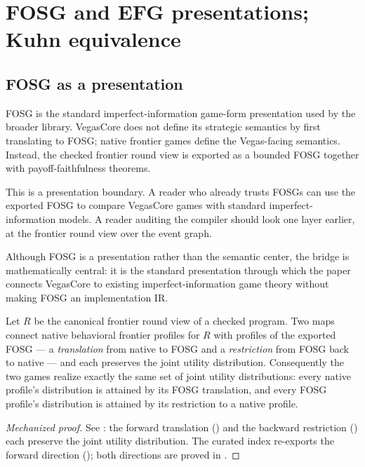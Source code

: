 \section{FOSG and EFG presentations; Kuhn equivalence}
\label{sec:presentations}

\subsection{FOSG as a presentation}

FOSG is the standard imperfect-information game-form presentation used
by the broader library.  VegasCore does not define its strategic
semantics by first translating to FOSG; native frontier games define the
Vegas-facing semantics.  Instead, the checked frontier round view is
exported as a bounded FOSG together with payoff-faithfulness theorems.

This is a presentation boundary.  A reader who already trusts FOSGs can
use the exported FOSG to compare VegasCore games with standard
imperfect-information models.  A reader auditing the compiler should
look one layer earlier, at the frontier round view over the event graph.

Although FOSG is a presentation rather than the semantic center, the
bridge is mathematically central: it is the standard presentation
through which the paper connects VegasCore to existing
imperfect-information game theory without making FOSG an implementation
IR.

\begin{theorem}
\label{thm:fosg}
Let \(R\) be the canonical frontier round view of a checked program.  Two maps
connect native behavioral frontier profiles for \(R\) with profiles of the
exported FOSG --- a \emph{translation} from native to FOSG and a
\emph{restriction} from FOSG back to native --- and each preserves the joint
utility distribution.  Consequently the two games realize exactly the same set
of joint utility distributions: every native profile's distribution is attained
by its FOSG translation, and every FOSG profile's distribution is attained by
its restriction to a native profile.
\end{theorem}

\begin{proof}[Mechanized proof]
See : the forward translation
() and the backward
restriction () each
preserve the joint utility distribution.  The curated index
 re-exports the forward direction
(); both directions are proved
in .
\end{proof}

